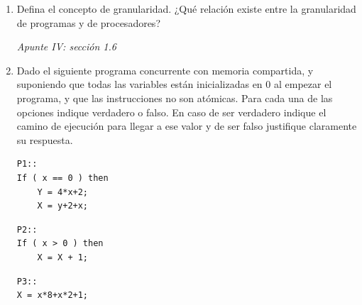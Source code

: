 \documentclass[a4paper, 10pt]{article}
\newenvironment{QandA}{
    \begin{enumerate}\bfseries}
    {\end{enumerate}
}
\newenvironment{answered}{\par\normalfont}{}
\begin{document}
\begin{QandA}
\begin{enumerate}[label=\alph*)]
\item Plantee conceptualmente posibles soluciones con las siguientes arquitecturas de red: Centralizada, simétrica y anillo circular. No implementar.
\begin{answered}
    \emph{Apunte III: sección 2.1}
\end{answered}
\item Analice las soluciones anteriores desde el punto de vista del número de mensajes y la performance global del sistema.
\begin{answered}
    \emph{Apunte II: sección 2.1.4}
\end{answered}
\end{enumerate}


\item Defina el concepto de granularidad. ¿Qué relación existe entre la granularidad de programas y de procesadores?
\begin{answered}
    \emph{Apunte IV: sección 1.6}
\end{answered}


\item Dado el siguiente programa concurrente con memoria compartida, y suponiendo que todas las variables están inicializadas en 0 al empezar el programa, y que las instrucciones no son atómicas. Para cada una de las opciones indique verdadero o falso. En caso de ser verdadero indique el camino de ejecución para llegar a ese valor y de ser falso justifique claramente su respuesta.

\begin{multicols}{3}
\begin{lstlisting}
P1::            
If ( x == 0 ) then
    Y = 4*x+2;
    X = y+2+x;
\end{lstlisting}
\columnbreak
\begin{lstlisting}
P2::            
If ( x > 0 ) then
    X = X + 1;
\end{lstlisting}
\columnbreak
\begin{lstlisting}
P3::            
X = x*8+x*2+1;
\end{lstlisting}
\end{multicols}


\end{QandA}
\end{document}
